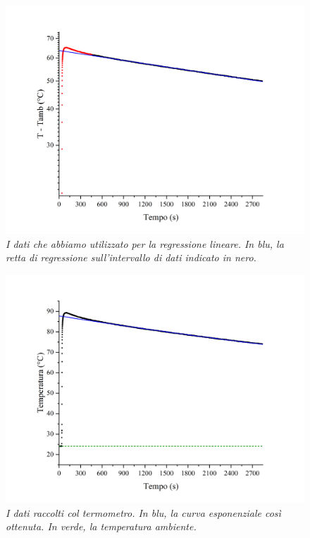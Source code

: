 \documentclass{article}
\begin{document}
\begin{center}
    \begin{figure}[H]
        \includegraphics[trim={2cm 1cm 2cm 2.1cm},clip,width=\textwidth]{img/LogLinFit.jpg}
        \caption{\emph{I dati che abbiamo utilizzato per la regressione lineare.
        In blu, la retta di regressione sull'intervallo di dati indicato in nero.
        }}
    \end{figure}
\end{center}
\begin{center}
    \begin{figure}[H]
        \includegraphics[trim={2cm 1cm 2cm 2.1cm},clip,width=\textwidth]{img/ExpFit.jpg}
        \caption[]{\emph{I dati raccolti col termometro.
        In blu, la curva esponenziale così ottenuta.
        In verde, la temperatura ambiente.
        }}
    \end{figure}
\end{center}
\end{document}

